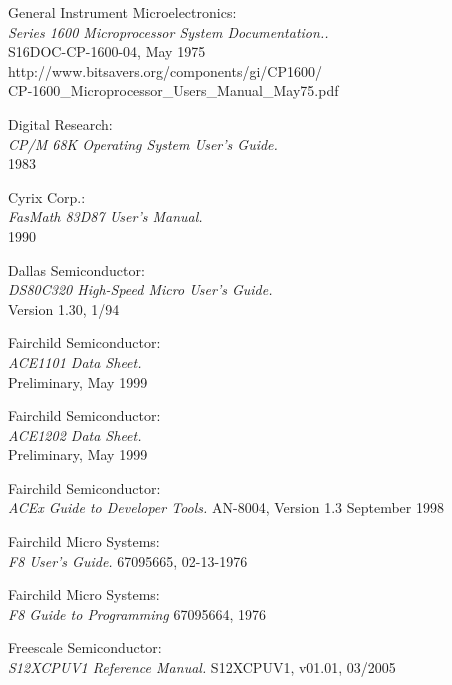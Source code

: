  General Instrument Microelectronics: \\
                 {\em Series 1600 Microprocessor System Documentation..\/} \\
                 S16DOC-CP-1600-04, May 1975 \\
                 http://www.bitsavers.org/components/gi/CP1600/ \\
                 CP-1600\_Microprocessor\_Users\_Manual\_May75.pdf

 Digital Research: \\
                 {\em CP/M 68K Operating System User's Guide.\/} \\
        	 1983

 Cyrix Corp.: \\
                {\em FasMath 83D87 User's Manual.\/} \\
		1990

 Dallas Semiconductor: \\
		    {\em DS80C320 High-Speed Micro User's Guide.\/} \\
                    Version 1.30, 1/94

 Fairchild Semiconductor: \\
                   {\em ACE1101 Data Sheet.\/} \\
                   Preliminary, May 1999

 Fairchild Semiconductor: \\
                   {\em ACE1202 Data Sheet.\/} \\
                   Preliminary, May 1999

 Fairchild Semiconductor: \\
                   {\em ACEx Guide to Developer Tools.\/}
                   AN-8004, Version 1.3 September 1998

 Fairchild Micro Systems: \\
                   {\em F8 User's Guide.\/}
                   67095665, 02-13-1976                   

 Fairchild Micro Systems: \\
                   {\em F8 Guide to Programming\/}
                   67095664, 1976

 Freescale Semiconductor: \\
                  {\em S12XCPUV1 Reference Manual.\/}
                  S12XCPUV1, v01.01, 03/2005

